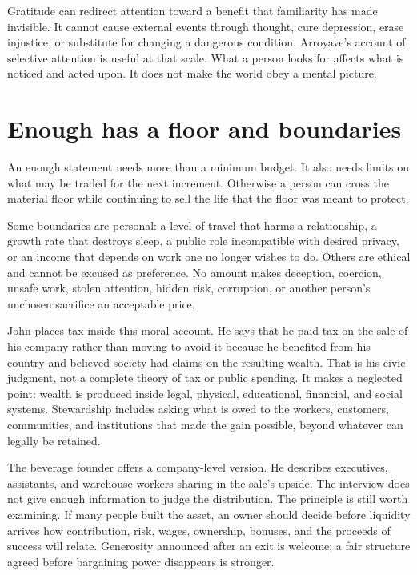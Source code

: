 Gratitude can redirect attention toward a benefit that familiarity has made
invisible. It cannot cause external events through thought, cure depression,
erase injustice, or substitute for changing a dangerous condition. Arroyave's
account of selective attention is useful at that scale. What a person looks
for affects what is noticed and acted upon. It does not make the world obey a
mental picture.

\section{Enough has a floor and boundaries}

An enough statement needs more than a minimum budget. It also needs limits on
what may be traded for the next increment. Otherwise a person can cross the
material floor while continuing to sell the life that the floor was meant to
protect.

Some boundaries are personal: a level of travel that harms a relationship, a
growth rate that destroys sleep, a public role incompatible with desired
privacy, or an income that depends on work one no longer wishes to do. Others
are ethical and cannot be excused as preference. No amount makes deception,
coercion, unsafe work, stolen attention, hidden risk, corruption, or another
person's unchosen sacrifice an acceptable price.

John places tax inside this moral account. He says that he paid tax on the
sale of his company rather than moving to avoid it because he benefited from
his country and believed society had claims on the resulting wealth. That is
his civic judgment, not a complete theory of tax or public spending. It makes
a neglected point: wealth is produced inside legal, physical, educational,
financial, and social systems. Stewardship includes asking what is owed to the
workers, customers, communities, and institutions that made the gain
possible, beyond whatever can legally be retained.

The beverage founder offers a company-level version. He describes executives,
assistants, and warehouse workers sharing in the sale's upside. The interview
does not give enough information to judge the distribution. The principle is
still worth examining. If many people built the asset, an owner should decide
before liquidity arrives how contribution, risk, wages, ownership, bonuses,
and the proceeds of success will relate. Generosity announced after an exit is
welcome; a fair structure agreed before bargaining power disappears is
stronger.

